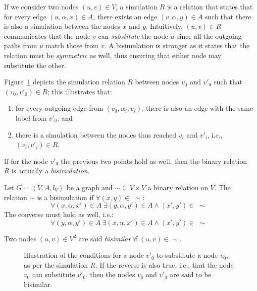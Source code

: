 If we consider two nodes $(u, v) \in V$, a simulation $R$ is a relation that states that for every edge $(u, \alpha, x) \in A$, there exists an edge $(v,\alpha, y) \in A$ such that there is also a simulation between the nodes $x$ and $y$. Intuitively, $(u,v) \in R$ communicates that the node $v$ can \emph{substitute} the node $u$ since all the outgoing paths from $u$ match those from $v$. A bisimulation is stronger as it states that the relation must be \emph{symmetric} as well, thus ensuring that either node may substitute the other.

Figure~\ref{chap4:summary:fig:bisimulation} depicts the simulation relation $R$ between nodes $v_0$ and $v'_0$ such that $(v_0, v'_0) \in R$; this illustrates that:
\begin{enumerate}
	\item for every outgoing edge from $(v_0,\alpha_i,v_i)$, there is also an edge with the same label from $v'_0$; and
	\item there is a simulation between the nodes thus reached $v_i$ and $v'_i$, i.e., $(v_i, v'_i) \in R$.
\end{enumerate}
If for the node $v'_0$ the previous two points hold as well, then the binary relation $R$ is actually a \emph{bisimulation}.

\begin{definition}[Bisimulation]
Let $G=\left\langle V, A, l_V \right\rangle$ be a graph and $\sim \subseteq V \times V$ a binary relation on $V$.
The relation $\sim$ is a bisimulation if $\forall (x,y) \in\; \sim$:
\begin{equation*}
\forall (x, \alpha, x') \in A\; \exists (y, \alpha, y') \in A \wedge (x',y') \in\; \sim
\label{eq:b1}
\end{equation*}
The converse must hold as well, i.e.:
\begin{equation*}
\forall (y, \alpha, y') \in A\; \exists (x, \alpha, x') \in A \wedge (x',y') \in\; \sim
\label{eq:b2}
\end{equation*}
\end{definition}

\begin{remark}
Two nodes $(u, v) \in V^2$ are said \emph{bisimilar} if $(u, v) \in \sim$.
\end{remark}

\begin{figure}
	\centering
	\resizebox{.8\textwidth}{!}{
		
	}
	\caption{Illustration of the conditions for a node $v'_0$ to substitute a node $v_0$, as per the simulation $R$. If the reverse is also true, i.e., that the node $v_0$ can substitute $v'_0$, then the nodes $v_0$ and $v'_0$ are said to be bisimilar.}
	\label{chap4:summary:fig:bisimulation}
\end{figure}

